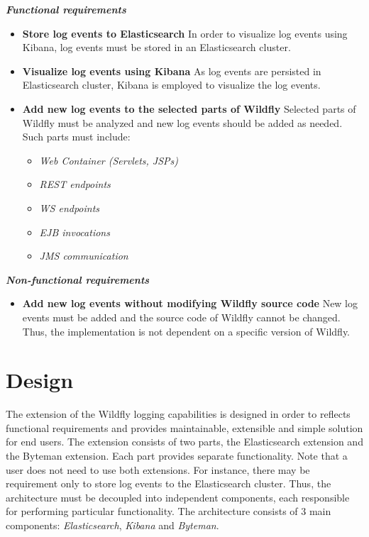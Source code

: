 \documentclass[12pt,oneside]{fithesis2}
\begin{document}
\noindent
\newline
\textit{\textbf{Functional requirements}}
\begin{itemize}
	\item \textbf{Store log events to Elasticsearch} \newline
	In order to visualize log events using Kibana, log events must be stored in an Elasticsearch cluster.
	\item \textbf{Visualize log events using Kibana} \newline
	As log events are persisted in Elasticsearch cluster, Kibana is employed to visualize the log events.
	\item \textbf{Add new log events to the selected parts of Wildfly}  \newline
	Selected parts of Wildfly must be analyzed and new log events should be added as needed. Such parts must include:
	 \begin{itemize}
	 	\item \textit{Web Container (Servlets, JSPs)}
	 	\item \textit{REST endpoints}
	 	\item \textit{WS endpoints}
	 	\item \textit{EJB invocations}
	 	\item \textit{JMS communication}
	 \end{itemize}
\end{itemize}

\noindent
\textit{\textbf{Non-functional requirements}}
\begin{itemize}
	\item \textbf{Add new log events without modifying Wildfly source code} \newline
	New log events must be added and the source code of Wildfly cannot be changed. Thus, the implementation is not dependent on a specific version of Wildfly.
\end{itemize}

\section{Design}
The extension of the Wildfly logging capabilities is designed in order to reflects functional requirements and provides maintainable, extensible and simple solution for end users. The extension consists of two parts, the Elasticsearch extension and the Byteman extension. Each part provides separate functionality. Note that a user does not need to use both extensions. For instance, there may be requirement only to store log events to the Elasticsearch cluster. Thus, the architecture must be decoupled into independent components, each responsible for performing particular functionality. The architecture consists of 3 main components: \textit{Elasticsearch}, \textit{Kibana} and \textit{Byteman}.
\end{document}
